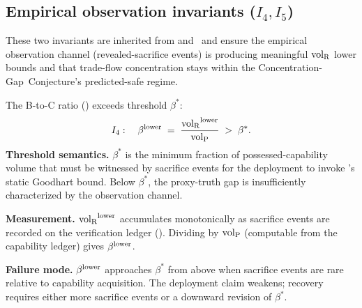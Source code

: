 \subsection{Empirical observation invariants (\texorpdfstring{$I_4, I_5$}{I4, I5})}
\label{sec:empirical_invariants}

These two invariants are inherited from \citep[Revealed~Sacrifice]{lasser2026paper8a} and~\citep[Need~Sufficiency]{lasser2026paper8b} and ensure
the empirical observation channel (revealed-sacrifice events) is
producing meaningful ${\operatorname{vol}_{\mathrm{R}}}$ lower bounds and that trade-flow
concentration stays within the Concentration-Gap~Conjecture's predicted-safe regime.

\begin{definition}
\label{inv:I4}
The B-to-C ratio (\citep[Definition of B-to-C ratio]{lasser2026paper8a})
exceeds threshold $\beta^*$:
\[
  I_4: \quad \beta^{\mathrm{lower}} \;=\; \frac{{\operatorname{vol}_{\mathrm{R}}}^{\mathrm{lower}}}{{\operatorname{vol}_{\mathrm{P}}}} \;>\; \beta^*.
\]
\textbf{Threshold semantics.} $\beta^*$ is the minimum fraction of
    possessed-capability volume that must be witnessed by sacrifice events for
    the deployment to invoke \citep[Microfoundation]{lasser2026micro}'s static
    Goodhart bound. Below $\beta^*$, the proxy-truth gap is insufficiently
    characterized by the observation channel.

\textbf{Measurement.} ${\operatorname{vol}_{\mathrm{R}}}^{\mathrm{lower}}$ accumulates monotonically as sacrifice
    events are recorded on the verification ledger (\citep[Proposition:
    Monotone Accumulation]{lasser2026paper8a}). Dividing by ${\operatorname{vol}_{\mathrm{P}}}$ (computable
    from the capability ledger) gives $\beta^{\mathrm{lower}}$.

\textbf{Failure mode.} $\beta^{\mathrm{lower}}$ approaches $\beta^*$ from above when sacrifice
    events are rare relative to capability acquisition. The deployment claim
    weakens; recovery requires either more sacrifice events or a downward
    revision of $\beta^*$.
\end{definition}

